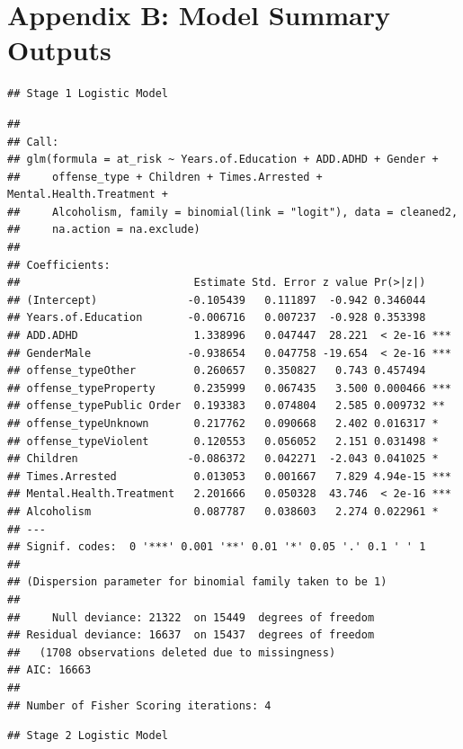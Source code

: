 \documentclass[
]{article}
\begin{document}
\newpage

\section{Appendix B: Model Summary
Outputs}\label{appendix-b-model-summary-outputs}

\begin{verbatim}
## Stage 1 Logistic Model
\end{verbatim}

\begin{verbatim}
## 
## Call:
## glm(formula = at_risk ~ Years.of.Education + ADD.ADHD + Gender + 
##     offense_type + Children + Times.Arrested + Mental.Health.Treatment + 
##     Alcoholism, family = binomial(link = "logit"), data = cleaned2, 
##     na.action = na.exclude)
## 
## Coefficients:
##                           Estimate Std. Error z value Pr(>|z|)    
## (Intercept)              -0.105439   0.111897  -0.942 0.346044    
## Years.of.Education       -0.006716   0.007237  -0.928 0.353398    
## ADD.ADHD                  1.338996   0.047447  28.221  < 2e-16 ***
## GenderMale               -0.938654   0.047758 -19.654  < 2e-16 ***
## offense_typeOther         0.260657   0.350827   0.743 0.457494    
## offense_typeProperty      0.235999   0.067435   3.500 0.000466 ***
## offense_typePublic Order  0.193383   0.074804   2.585 0.009732 ** 
## offense_typeUnknown       0.217762   0.090668   2.402 0.016317 *  
## offense_typeViolent       0.120553   0.056052   2.151 0.031498 *  
## Children                 -0.086372   0.042271  -2.043 0.041025 *  
## Times.Arrested            0.013053   0.001667   7.829 4.94e-15 ***
## Mental.Health.Treatment   2.201666   0.050328  43.746  < 2e-16 ***
## Alcoholism                0.087787   0.038603   2.274 0.022961 *  
## ---
## Signif. codes:  0 '***' 0.001 '**' 0.01 '*' 0.05 '.' 0.1 ' ' 1
## 
## (Dispersion parameter for binomial family taken to be 1)
## 
##     Null deviance: 21322  on 15449  degrees of freedom
## Residual deviance: 16637  on 15437  degrees of freedom
##   (1708 observations deleted due to missingness)
## AIC: 16663
## 
## Number of Fisher Scoring iterations: 4
\end{verbatim}

\begin{verbatim}
## Stage 2 Logistic Model
\end{verbatim}
\end{document}
